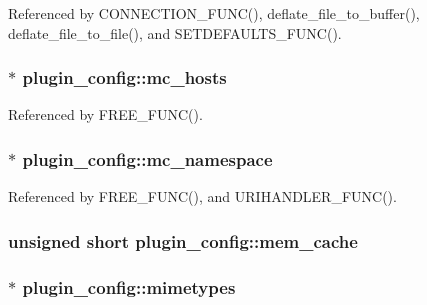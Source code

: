 Referenced by C\-O\-N\-N\-E\-C\-T\-I\-O\-N\-\_\-\-F\-U\-N\-C(), deflate\-\_\-file\-\_\-to\-\_\-buffer(), deflate\-\_\-file\-\_\-to\-\_\-file(), and S\-E\-T\-D\-E\-F\-A\-U\-L\-T\-S\-\_\-\-F\-U\-N\-C().

\hypertarget{structplugin__config_a66fcd0008e865cbc0fd098c805db8082}{
\subsubsection[{mc\-\_\-hosts}]{ $\ast$ plugin\-\_\-config\-::mc\-\_\-hosts}}\label{structplugin__config_a66fcd0008e865cbc0fd098c805db8082}


Referenced by F\-R\-E\-E\-\_\-\-F\-U\-N\-C().

\hypertarget{structplugin__config_ab49f89fd918e1d87b4b6ca39efc92ec0}{
\subsubsection[{mc\-\_\-namespace}]{ $\ast$ plugin\-\_\-config\-::mc\-\_\-namespace}}\label{structplugin__config_ab49f89fd918e1d87b4b6ca39efc92ec0}


Referenced by F\-R\-E\-E\-\_\-\-F\-U\-N\-C(), and U\-R\-I\-H\-A\-N\-D\-L\-E\-R\-\_\-\-F\-U\-N\-C().

\hypertarget{structplugin__config_a1e24f7a2f348c4d7b764aa39eec8e933}{
\subsubsection[{mem\-\_\-cache}]{\setlength{\rightskip}{0pt plus 5cm}unsigned short plugin\-\_\-config\-::mem\-\_\-cache}}\label{structplugin__config_a1e24f7a2f348c4d7b764aa39eec8e933}
\hypertarget{structplugin__config_a57d3457480703ae7f40e0ada85cf25ef}{
\subsubsection[{mimetypes}]{$\ast$ plugin\-\_\-config\-::mimetypes}}\label{structplugin__config_a57d3457480703ae7f40e0ada85cf25ef}



